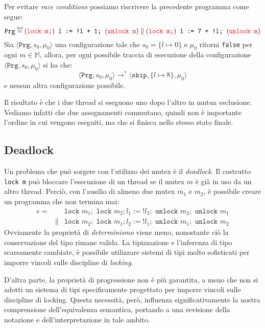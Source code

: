 Per evitare \textit{race conditions} possiamo riscrivere la precedente programma 
come segue:
\[
    \texttt{Prg} \defeq (\textcolor{red}{\texttt{lock m;}})
    \texttt{ l := !l + 1; }
    (\textcolor{red}{\texttt{unlock m}})
    \parallel
    (\textcolor{red}{\texttt{lock m;}})
    \texttt{ l := 7 + !l; }
    (\textcolor{red}{\texttt{unlock m}})
\]
Sia $\langle \texttt{Prg}, s_0, \mu_0\rangle$ una configurazione tale che 
$s_0 = \{l \mapsto 0\}$ e $\mu_0$ ritorni \texttt{false} per ogni
$m \in \mathbb{M}$, allora, per ogni possibile traccia di esecuzione della 
configurazione $\langle \texttt{Prg}, s_0, \mu_0\rangle$ si ha che:
\[
  \langle \texttt{Prg}, s_0, \mu_0\rangle \rightarrow^* \langle \texttt{skip},
  \{l \mapsto 8\}, \mu_0 \rangle  
\]
e nessun altra configurazione possibile.

Il risultato è che i due thread si eseguono
uno dopo l'altro in mutua esclusione. Vediamo infatti che 
due assegnamenti commutano, quindi
non è importante l'ordine in cui vengono eseguiti, ma che si finisca 
nello stesso stato finale.
\subsection{Deadlock}
Un problema che può sorgere con l'utilizzo dei mutex è il \textit{deadlock}.
Il costrutto \texttt{lock m} può bloccare l'esecuzione di un thread se il mutex 
$m$ è già in uso da un altro thread. Perciò, con l'ausilio di almeno due 
mutex $m_1$ e $m_2$, è possibile creare un programma che non termina mai:
\[
    \begin{array}{lll}
        e= & & \texttt{lock }m_1; \texttt{ lock }m_2; l_1 := !l_2;
        \texttt{ unlock }m_2; \texttt{ unlock }m_1 \\
        & \parallel & \texttt{lock }m_2; \texttt{ lock }m_1; l_2 := !l_1;
        \texttt{ unlock }m_1; \texttt{ unlock }m_2     
    \end{array}
\]
Ovviamente la proprietà di \textit{determinismo} viene meno, nonostante ciò 
la conservazione del tipo rimane valida. La tipizzazione e 
l'inferenza di tipo scarsamente cambiate, è possibile utilizzare sistemi 
di tipi molto sofisticati per imporre vincoli sulle discipline 
di \textit{locking}.

D'altra parte, la proprietà di progressione non è più garantita, a meno
che non si adotti un sistema di tipi specificamente progettato per imporre
vincoli sulle discipline di locking. Questa necessità, però, influenza
significativamente la nostra comprensione dell'equivalenza semantica,
portando a una revisione
della notazione e dell'interpretazione in tale ambito.
